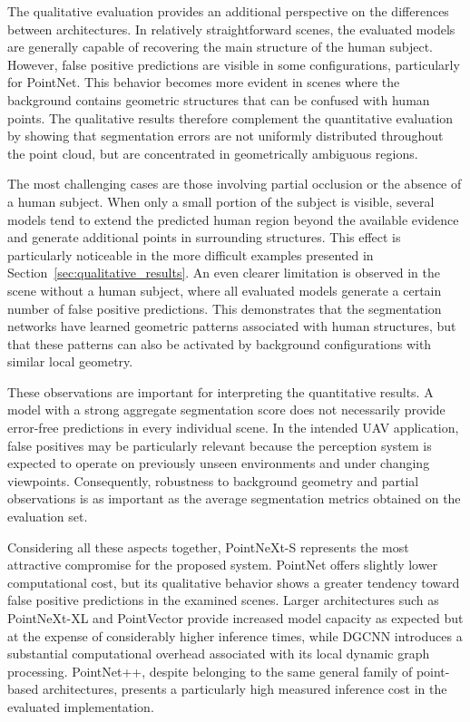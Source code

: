 The qualitative evaluation provides an additional perspective on the differences between architectures. In relatively straightforward scenes, the evaluated models are generally capable of recovering the main structure of the human subject. However, false positive predictions are visible in some configurations, particularly for PointNet. This behavior becomes more evident in scenes where the background contains geometric structures that can be confused with human points. The qualitative results therefore complement the quantitative evaluation by showing that segmentation errors are not uniformly distributed throughout the point cloud, but are concentrated in geometrically ambiguous regions.

The most challenging cases are those involving partial occlusion or the absence of a human subject. When only a small portion of the subject is visible, several models tend to extend the predicted human region beyond the available evidence and generate additional points in surrounding structures. This effect is particularly noticeable in the more difficult examples presented in Section~\ref{sec:qualitative_results}. An even clearer limitation is observed in the scene without a human subject, where all evaluated models generate a certain number of false positive predictions. This demonstrates that the segmentation networks have learned geometric patterns associated with human structures, but that these patterns can also be activated by background configurations with similar local geometry.

These observations are important for interpreting the quantitative results. A model with a strong aggregate segmentation score does not necessarily provide error-free predictions in every individual scene. In the intended UAV application, false positives may be particularly relevant because the perception system is expected to operate on previously unseen environments and under changing viewpoints. Consequently, robustness to background geometry and partial observations is as important as the average segmentation metrics obtained on the evaluation set.

Considering all these aspects together, PointNeXt-S represents the most attractive compromise for the proposed system. PointNet offers slightly lower computational cost, but its qualitative behavior shows a greater tendency toward false positive predictions in the examined scenes. Larger architectures such as PointNeXt-XL and PointVector provide increased model capacity as expected but at the expense of considerably higher inference times, while DGCNN introduces a substantial computational overhead associated with its local dynamic graph processing. PointNet++, despite belonging to the same general family of point-based architectures, presents a particularly high measured inference cost in the evaluated implementation.

